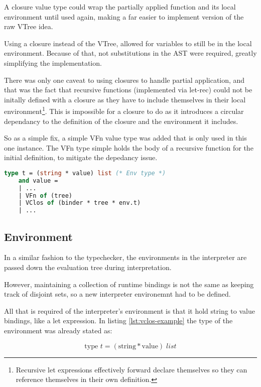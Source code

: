 \documentclass{l4proj}
\begin{document}
A closure value type could wrap the partially applied function and its local environment until used again, making a far easier to implement version of the raw VTree idea.

Using a closure instead of the VTree, allowed for variables to still be in the local environment.
Because of that, not substitutions in the AST were required, greatly simplifying the implementation.

There was only one caveat to using closures to handle partial application, and that was the fact that recursive functions (implemented via let-rec) could not be initally defined with a closure as they have to include themselves in their local environment\footnote{Recursive let expressions effectively forward declare themselves so they can reference themselves in their own definition.}.
This is impossible for a closure to do as it introduces a circular dependancy to the definition of the closure and the environment it includes.

So as a simple fix, a simple VFn value type was added that is only used in this one instance.
The VFn type simple holds the body of a recursive function for the initial definition, to mitigate the depedancy issue.

\begin{lstlisting}[language=Caml, label=lst:vclos-example, caption=The aditional type definitions of a VClos and VFn.]
    type t = (string * value) list (* Env type *)
    and value = 
    | ...
    | VFn of (tree)
    | VClos of (binder * tree * env.t)
    | ...
\end{lstlisting}

\subsection{Environment}

In a similar fashion to the typechecker, the environments in the interpreter are passed down the evaluation tree during interpretation.

However, maintaining a collection of runtime bindings is not the same as keeping track of disjoint sets, so a new interpreter environemnt had to be defined.

All that is required of the interpreter's environment is that it hold string to value bindings, like a let expression.
In listing \ref{lst:vclos-example} the type of the environment was already stated as:

\[\text{type } t = (\text{string} * \text{value}) \;list\]
\end{document}
